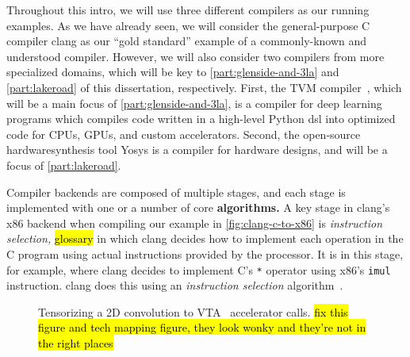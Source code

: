 Throughout this intro,
  we will use three different compilers
  as our running examples.
As we have already seen, we will
  consider the
  general-purpose C compiler
  clang
  as our ``gold standard'' example
  of a commonly-known
  and understood compiler.
However, we will also consider
  two compilers from more specialized
  domains,
  which will be key to
  \cref{part:glenside-and-3la}
  and
  \cref{part:lakeroad}
  of this dissertation,
  respectively.
First,
  the TVM compiler~\cite{tvm,chen2018tvm},
  which will be a main focus
  of \cref{part:glenside-and-3la},
  is a compiler for deep learning
  programs
  which compiles code written in a
  high-level
  Python
  \gls{dsl}
  into optimized code
  for CPUs, GPUs,
  and custom accelerators.
Second,
  the open-source \gls{hardwaresynthesis}
  tool Yosys
  is a compiler for hardware designs,
  and will be a focus of
  \cref{part:lakeroad}.

Compiler backends are composed
  of multiple stages,
  and each stage is implemented with
  one or a number of core
  \textbf{algorithms.}
A key stage in clang's x86 backend
  when compiling our example in
  \cref{fig:clang-c-to-x86}
  is
  \textit{instruction selection,}
  \hl{glossary}
  in which clang decides how to implement
  each operation in the C program
  using actual instructions
  provided by the processor.
It is in this stage, for example, 
  where clang decides to
  implement
  C's \texttt{*} operator
  using x86's
  \texttt{imul} instruction.
clang does this using
  an \textit{instruction selection}
  algorithm~\cite{llvminstructionselection}.

\begin{figure}
\centering
{}
\caption{Tensorizing a 2D convolution to VTA~\cite{moreau2018vta} accelerator calls.
\hl{fix this figure and tech mapping figure, they look wonky and they're not in the right places}}
\label{fig:intro:tensorization}
\end{figure}


